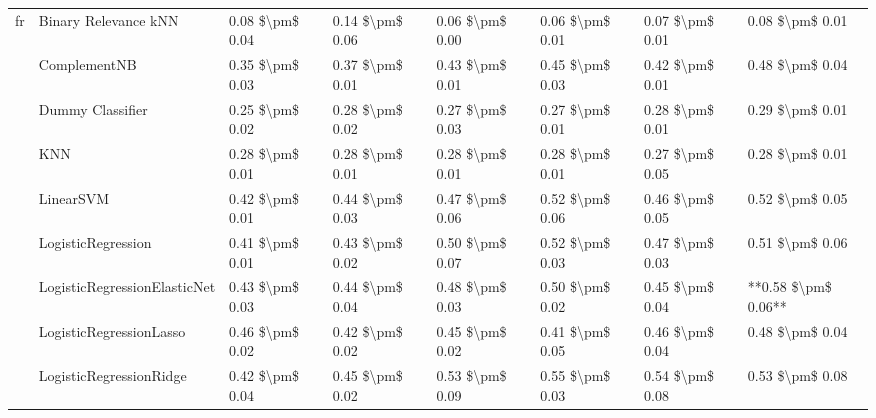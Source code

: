 \begin{tabular}{llllllll}
fr & Binary Relevance kNN &  0.08 \$\textbackslash pm\$ 0.04 &           0.14 \$\textbackslash pm\$ 0.06 &       0.06 \$\textbackslash pm\$ 0.00 &        0.06 \$\textbackslash pm\$ 0.01 &                         0.07 \$\textbackslash pm\$ 0.01 &      0.08 \$\textbackslash pm\$ 0.01 \\
   & ComplementNB &  0.35 \$\textbackslash pm\$ 0.03 &           0.37 \$\textbackslash pm\$ 0.01 &       0.43 \$\textbackslash pm\$ 0.01 &        0.45 \$\textbackslash pm\$ 0.03 &                         0.42 \$\textbackslash pm\$ 0.01 &      0.48 \$\textbackslash pm\$ 0.04 \\
   & Dummy Classifier &  0.25 \$\textbackslash pm\$ 0.02 &           0.28 \$\textbackslash pm\$ 0.02 &       0.27 \$\textbackslash pm\$ 0.03 &        0.27 \$\textbackslash pm\$ 0.01 &                         0.28 \$\textbackslash pm\$ 0.01 &      0.29 \$\textbackslash pm\$ 0.01 \\
   & KNN &  0.28 \$\textbackslash pm\$ 0.01 &           0.28 \$\textbackslash pm\$ 0.01 &       0.28 \$\textbackslash pm\$ 0.01 &        0.28 \$\textbackslash pm\$ 0.01 &                         0.27 \$\textbackslash pm\$ 0.05 &      0.28 \$\textbackslash pm\$ 0.01 \\
   & LinearSVM &  0.42 \$\textbackslash pm\$ 0.01 &           0.44 \$\textbackslash pm\$ 0.03 &       0.47 \$\textbackslash pm\$ 0.06 &        0.52 \$\textbackslash pm\$ 0.06 &                         0.46 \$\textbackslash pm\$ 0.05 &      0.52 \$\textbackslash pm\$ 0.05 \\
   & LogisticRegression &  0.41 \$\textbackslash pm\$ 0.01 &           0.43 \$\textbackslash pm\$ 0.02 &       0.50 \$\textbackslash pm\$ 0.07 &        0.52 \$\textbackslash pm\$ 0.03 &                         0.47 \$\textbackslash pm\$ 0.03 &      0.51 \$\textbackslash pm\$ 0.06 \\
   & LogisticRegressionElasticNet &  0.43 \$\textbackslash pm\$ 0.03 &           0.44 \$\textbackslash pm\$ 0.04 &       0.48 \$\textbackslash pm\$ 0.03 &        0.50 \$\textbackslash pm\$ 0.02 &                         0.45 \$\textbackslash pm\$ 0.04 &  **0.58 \$\textbackslash pm\$ 0.06** \\
   & LogisticRegressionLasso &  0.46 \$\textbackslash pm\$ 0.02 &           0.42 \$\textbackslash pm\$ 0.02 &       0.45 \$\textbackslash pm\$ 0.02 &        0.41 \$\textbackslash pm\$ 0.05 &                         0.46 \$\textbackslash pm\$ 0.04 &      0.48 \$\textbackslash pm\$ 0.04 \\
   & LogisticRegressionRidge &  0.42 \$\textbackslash pm\$ 0.04 &           0.45 \$\textbackslash pm\$ 0.02 &       0.53 \$\textbackslash pm\$ 0.09 &        0.55 \$\textbackslash pm\$ 0.03 &                         0.54 \$\textbackslash pm\$ 0.08 &      0.53 \$\textbackslash pm\$ 0.08 \\

\end{tabular}
